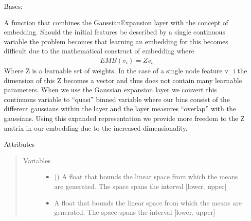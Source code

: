 \documentclass[letterpaper,10pt,english]{sphinxmanual}
\begin{document}
\begin{fulllineitems}
\label{\detokenize{modules/gqcml.nn:gqcml.nn.layers.GaussianEmbedding}}
Bases: 

A function that combines the GaussianExpansion layer with the concept of embedding.
Should the initial features be described by a single continuous variable the problem
becomes that learning an embedding for this becomes difficult due to the mathematical
construct of embedding where
\begin{equation*}
\begin{split}EMB(v_i) = Zv_i\end{split}
\end{equation*}
Where Z is a learnable set of weights. In the case of a single node feature v\_i
the dimension of this Z becomes a vector and thus does not contain many learnable parameters.
When we use the Gaussian expansion layer we convert this continuous variable to “quasi” binned variable
where our bins consist of the different gaussians within the layer and the layer measures “overlap” with the gaussians.
Using this expanded representation we provide more freedom to the Z matrix in our embedding due to the increased dimensionality.

Attributes
\begin{quote}\begin{description}
\item[{Variables}] \leavevmode\begin{itemize}
\item {} 
\sphinxstyleliteralstrong{\sphinxupquote{(}}\sphinxstyleliteralstrong{\sphinxupquote{)}} () \textendash{} A float that bounds the linear space from which the means are generated.
The space spans the interval {[}lower, upper{]}

\item {} 
\sphinxstyleliteralstrong{\sphinxupquote{(}}\sphinxstyleliteralstrong{\sphinxupquote{)}} \textendash{} A float that bounds the linear space from which the means are generated.
The space spans the interval {[}lower, upper{]}


\end{itemize}
\end{description}
\end{quote}
\end{fulllineitems}
\end{document}
